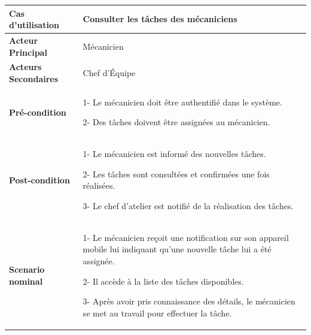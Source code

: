\begin{table}[htbp]
  \centering
  \renewcommand{\arraystretch}{1.7} %
  \begin{tabular}{|p{4cm}|p{9cm}|}
    \hline
    \textbf{Cas d'utilisation}    & Consulter les tâches des  mécaniciens                                                                                            \\
    \hline
    \textbf{Acteur Principal}     & Mécanicien                                                                                                                       \\
    \hline
    \textbf{Acteurs Secondaires } & Chef d’Équipe                                                                                                                    \\
    \hline
    \textbf{Pré-condition}        & 1- Le mécanicien doit être authentifié dans le système.\newline

    2- Des tâches doivent être assignées au mécanicien.                                                                                                              \\
    \hline
    \textbf{Post-condition}       & 1- Le mécanicien est informé des nouvelles tâches.\newline

    2- Les tâches sont consultées et confirmées une fois réalisées.             \newline

    3- Le chef d’atelier est notifié de la réalisation des tâches.                                                                                                   \\

    \hline
    \textbf{Scenario nominal}     & 1- Le mécanicien reçoit une notification sur son appareil mobile lui indiquant qu'une nouvelle tâche lui a été assignée.\newline


    2- Il accède à la liste des tâches disponibles.\newline

    3- Après avoir pris connaissance des détails, le mécanicien se met au travail pour effectuer la tâche.                                                           \\
  \end{tabular}

\end{table}


